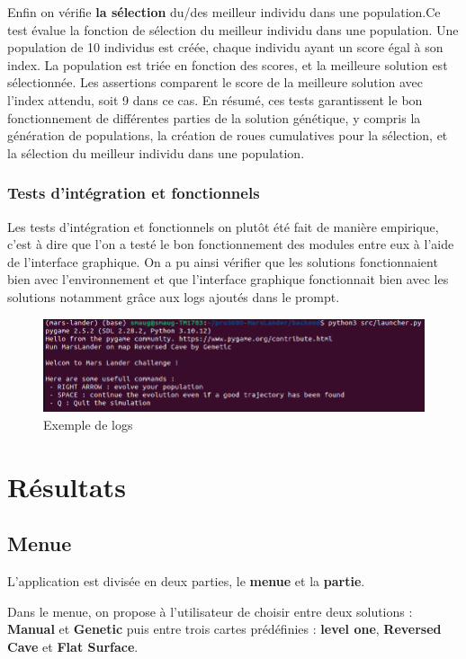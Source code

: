 \documentclass[french,a4paper,10pt,twocolumn]{article}
\begin{document}
Enfin on vérifie \textbf{la sélection} du/des meilleur individu dans une population.Ce test évalue la fonction de sélection du meilleur individu dans une population. 
Une population de 10 individus est créée, chaque individu ayant un score égal à son index. La population est triée en fonction des scores,
et la meilleure solution est sélectionnée. Les assertions comparent le score de la meilleure solution avec l'index attendu, soit 9 dans ce cas.
En résumé, ces tests garantissent le bon fonctionnement de différentes parties de la solution génétique, y compris la génération de populations, la création de roues cumulatives pour la sélection, et la sélection du meilleur individu dans une population.

\subsubsection{Tests d'intégration et fonctionnels}
Les tests d'intégration et fonctionnels on plutôt été fait de manière empirique, c'est à dire que l'on a testé le bon fonctionnement des modules entre eux à l'aide de l'interface graphique.
On a pu ainsi vérifier que les solutions fonctionnaient bien avec l'environnement et que l'interface graphique fonctionnait bien avec les solutions notamment grâce aux logs ajoutés dans le prompt.

\begin{figure}[H]
    \centering
    \includegraphics[scale=0.5]{images/log_prompt_menue.png}
    \caption{Exemple de logs}\label{fig:logs}
\end{figure}


\section{Résultats}

\subsection{Menue}
L'application est divisée en deux parties, le \textbf{menue} et la \textbf{partie}.

Dans le menue, on propose à l'utilisateur de choisir entre deux solutions : \textbf{Manual} et \textbf{Genetic} puis entre trois cartes prédéfinies : \textbf{level one}, \textbf{Reversed Cave} et \textbf{Flat Surface}.
\end{document}
